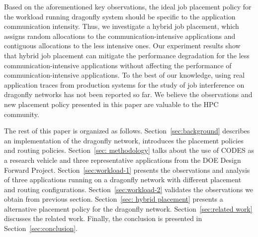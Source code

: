Based on the aforementioned key observations, the ideal job placement policy for the workload running dragonfly system should be specific to the application communication intensity. Thus, we investigate a hybrid job placement, which assigns random allocations to the communication-intensive applications and contiguous allocations to the less intensive ones. Our experiment results show that hybrid job placement can mitigate the performance degradation for the less communication-intensive applications without affecting the performance of communication-intensive applications.
To the best of our knowledge, using real application traces from production systems for the study of job interference on dragonfly networks has not been reported so far. We believe the observations and new placement policy presented in this paper are valuable to the HPC community.


The rest of this paper is organized as follows. Section~\ref{sec:background} describes an implementation of the dragonfly network, introduces the placement policies and routing policies. Section~\ref{sec: methodology} talks about the use of CODES as a research vehicle and three representative applications from the DOE Design Forward Project. Section~\ref{sec:workload-1} presents the observations and analysis of three applications running on a dragonfly network with different placement and routing configurations. Section~\ref{sec:workload-2} validates the observations we obtain from previous section. Section~\ref{sec: hybrid placement} presents a alternative placement policy for the dragonfly network. Section~\ref{sec:related work} discusses the related work. Finally, the conclusion is presented in Section~\ref{sec:conclusion}.


